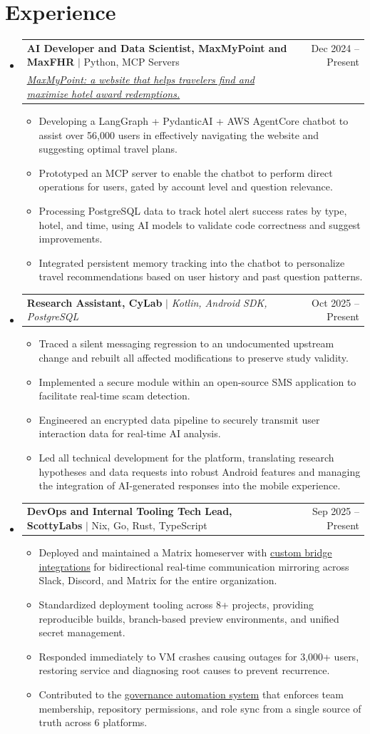 \documentclass[letterpaper,11pt]{article}
\makeatletter
\newcommand{\resumeItem}[1]{
  \item\small{
    {#1 \vspace{-2pt}}
  }
}
\newcommand{\resumeProjectLinkHeading}[3]{
    \item
    \begin{tabular*}{0.97\textwidth}{l@{\extracolsep{\fill}}r}
      \small#1 & #2 \\
      \small#3 \\
    \end{tabular*}\vspace{-7pt}
}
\newcommand{\resumeSmallJob}[2]{
    \item
    \begin{tabular*}{0.97\textwidth}{l@{\extracolsep{\fill}}r}
      \small#1 & #2 \\
    \end{tabular*}\vspace{-7pt}
}
\newcommand{\resumeSubHeadingListStart}{\begin{itemize}[leftmargin=0.15in, label={}]}
\newcommand{\resumeSubHeadingListEnd}{\end{itemize}}
\newcommand{\resumeItemListStart}{\begin{itemize}}
\newcommand{\resumeItemListEnd}{\end{itemize}\vspace{-5pt}}
\makeatother
\begin{document}
\section{Experience}
    \resumeSubHeadingListStart
        \resumeProjectLinkHeading
              {\textbf{AI Developer and Data Scientist, MaxMyPoint and MaxFHR} $|$ Python, MCP Servers}{Dec 2024 -- Present}
            {\href{https://maxmypoint.com/}{\textit{\underline{MaxMyPoint}: a website that helps travelers find and maximize hotel award redemptions.}}}
              \resumeItemListStart
                \resumeItem{Developing a LangGraph + PydanticAI + AWS AgentCore chatbot to assist over 56,000 users in effectively navigating the website and suggesting optimal travel plans.}
                \resumeItem{Prototyped an MCP server to enable the chatbot to perform direct operations for users, gated by account level and question relevance.}
                \resumeItem{Processing PostgreSQL data to track hotel alert success rates by type, hotel, and time, using AI models to validate code correctness and suggest improvements.}
                \resumeItem{Integrated persistent memory tracking into the chatbot to personalize travel recommendations based on user history and past question patterns.}
              \resumeItemListEnd

        \resumeSmallJob
        {\textbf{Research Assistant, CyLab} $|$ \emph{Kotlin, Android SDK, PostgreSQL}}{Oct 2025 -- Present}
          \resumeItemListStart
            \resumeItem{Traced a silent messaging regression to an undocumented upstream change and rebuilt all affected modifications to preserve study validity.}
            \resumeItem{Implemented a secure module within an open-source SMS application to facilitate real-time scam detection.}
            \resumeItem{Engineered an encrypted data pipeline to securely transmit user interaction data for real-time AI analysis.}
            \resumeItem{Led all technical development for the platform, translating research hypotheses and data requests into robust Android features and managing the integration of AI-generated responses into the mobile experience.}
          \resumeItemListEnd

        \resumeSmallJob
          {\textbf{DevOps and Internal Tooling Tech Lead, ScottyLabs} $|$ Nix, Go, Rust, TypeScript}{Sep 2025 -- Present}
          \resumeItemListStart
            \resumeItem{Deployed and maintained a Matrix homeserver with \href{https://github.com/thesuperRL/mautrix-discord}{\underline{custom bridge integrations}} for bidirectional real-time communication mirroring across Slack, Discord, and Matrix for the entire organization.}
            \resumeItem{Standardized deployment tooling across 8+ projects, providing reproducible builds, branch-based preview environments, and unified secret management.}
            \resumeItem{Responded immediately to VM crashes causing outages for 3,000+ users, restoring service and diagnosing root causes to prevent recurrence.}
            \resumeItem{Contributed to the \href{https://github.com/ScottyLabs/governance}{\underline{governance automation system}} that enforces team membership, repository permissions, and role sync from a single source of truth across 6 platforms.}
          \resumeItemListEnd
    \resumeSubHeadingListEnd
\end{document}
